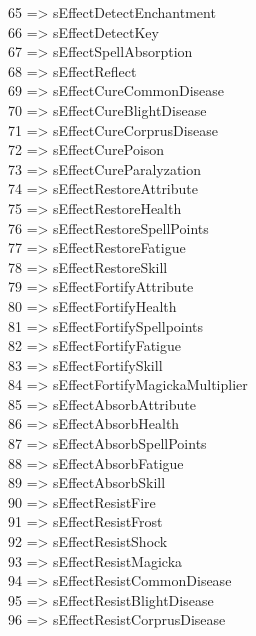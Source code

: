 65 =\textgreater{} sEffectDetectEnchantment\\
66 =\textgreater{} sEffectDetectKey\\
67 =\textgreater{} sEffectSpellAbsorption\\
68 =\textgreater{} sEffectReflect\\
69 =\textgreater{} sEffectCureCommonDisease\\
70 =\textgreater{} sEffectCureBlightDisease\\
71 =\textgreater{} sEffectCureCorprusDisease\\
72 =\textgreater{} sEffectCurePoison\\
73 =\textgreater{} sEffectCureParalyzation\\
74 =\textgreater{} sEffectRestoreAttribute\\
75 =\textgreater{} sEffectRestoreHealth\\
76 =\textgreater{} sEffectRestoreSpellPoints\\
77 =\textgreater{} sEffectRestoreFatigue\\
78 =\textgreater{} sEffectRestoreSkill\\
79 =\textgreater{} sEffectFortifyAttribute\\
80 =\textgreater{} sEffectFortifyHealth\\
81 =\textgreater{} sEffectFortifySpellpoints\\
82 =\textgreater{} sEffectFortifyFatigue\\
83 =\textgreater{} sEffectFortifySkill\\
84 =\textgreater{} sEffectFortifyMagickaMultiplier\\
85 =\textgreater{} sEffectAbsorbAttribute\\
86 =\textgreater{} sEffectAbsorbHealth\\
87 =\textgreater{} sEffectAbsorbSpellPoints\\
88 =\textgreater{} sEffectAbsorbFatigue\\
89 =\textgreater{} sEffectAbsorbSkill\\
90 =\textgreater{} sEffectResistFire\\
91 =\textgreater{} sEffectResistFrost\\
92 =\textgreater{} sEffectResistShock\\
93 =\textgreater{} sEffectResistMagicka\\
94 =\textgreater{} sEffectResistCommonDisease\\
95 =\textgreater{} sEffectResistBlightDisease\\
96 =\textgreater{} sEffectResistCorprusDisease\\
